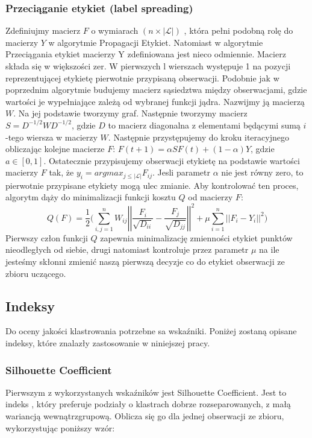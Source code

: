 \documentclass{article}
\begin{document}
\subsubsection{Przeciąganie etykiet (label spreading)}
Zdefiniujmy macierz \(F\) o wymiarach \((n \times |\mathcal{L}|)\) , która pełni podobną rolę do macierzy \(Y\) w algorytmie Propagacji Etykiet.
Natomiast w algorytmie Przeciągania etykiet macierzy Y zdefiniowana jest nieco odmiennie.
Macierz składa się w większości zer. W pierwszych l wierszach występuje 1 na pozycji reprezentującej etykietę pierwotnie przypisaną obserwacji.
Podobnie jak w poprzednim algorytmie budujemy macierz sąsiedztwa między obserwacjami, gdzie wartości je wypełniające zależą od wybranej funkcji jądra.
Nazwijmy ją macierzą \(W\). Na jej podstawie tworzymy graf. 
Następnie tworzymy macierz \(S = D^{-1/2}WD^{-1/2}\), gdzie \(D\) to macierz diagonalna z elementami będącymi sumą \(i\)-tego wiersza w macierzy \(W\).
Następnie przystępujemy do kroku iteracyjnego obliczając kolejne macierze \(F\): \(F(t+1) = \alpha SF(t) + (1 - \alpha)Y\), gdzie \(a \in [0,1]\).
Ostatecznie przypisujemy obserwacji etykietę na podstawie wartości macierzy \(F\) tak, że \(y_i = argmax_{j\leqslant |\mathcal{L}|} F_{ij}\).
Jesli parametr \(\alpha\) nie jest równy zero, to pierwotnie przypisane etykiety mogą ulec zmianie.
Aby kontrolować ten proces, algorytm dąży do minimalizacji funkcji kosztu \(Q\) od macierzy \(F\):
\[Q(F) = \frac{1}{2}\bigg(\sum\limits^n_{i,j=1}W_{ij}\left|\left| \frac{F_i}{\sqrt{D_{ii}}} -
\frac{F_j}{\sqrt{D_{jj}}}\right|\right|^2 + \mu\sum\limits^n_{i=1}
\left|\left|F_i - Y_i\right|\right|^2 \bigg)\]
Pierwszy człon funkcji \(Q\) zapewnia minimalizację zmienności etykiet punktów nieodległych od siebie, drugi natomiast kontroluje przez parametr \(\mu\) na ile jesteśmy skłonni zmienić naszą pierwszą decyzje co do etykiet obserwacji ze zbioru uczącego\citep{Zhou2004}.	
\subsection{Indeksy}
Do oceny jakości klastrowania potrzebne sa wskaźniki.
Poniżej zostaną opisane indeksy, które znalazły zastosowanie w niniejszej pracy.

\subsubsection{Silhouette Coefficient}
Pierwszym z wykorzystanych wskaźników jest Silhouette Coefficient.
Jest to indeks , który preferuje podziały o klastrach dobrze rozseparowanych, z małą wariancją wewnątrzgrupową\citep{Arbelaitz2013}. Oblicza się go dla jednej obserwacji ze zbioru, wykorzystując poniższy wzór:
\end{document}
